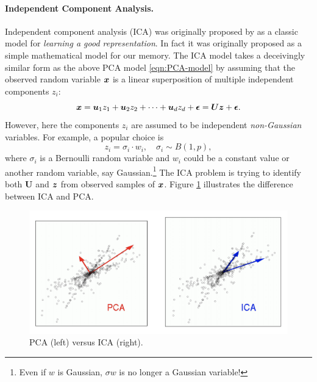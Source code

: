 \documentclass[../../book-main.tex]{subfiles}
\begin{document}
\paragraph{Independent Component Analysis.}
Independent component analysis (ICA) was originally proposed by \cite{Ans-1985} as a classic model for {\em learning a good representation}. In fact it was originally proposed as a simple mathematical model for our memory. The ICA model takes a deceivingly similar form as the above PCA model \eqref{eqn:PCA-model} by assuming that the observed random variable $\bm{x}$ is a linear superposition of multiple independent components $z_i$:
\begin{equation}
    \bm{x} = \boldsymbol{u}_1 z_1 + \boldsymbol{u}_2 z_2 + \cdots + \boldsymbol{u}_d z_d  + \boldsymbol{\epsilon} =  \boldsymbol{U} \bm{z} + \boldsymbol{\epsilon}.
    \label{eqn:ICA-model}
\end{equation}
However, here the components $z_i$ are assumed to be independent {\em non-Gaussian} variables. For example, a popular choice is
\begin{equation}
    z_i = \sigma_i \cdot w_i, \quad \sigma_i \sim B(1,p),
    \label{eqn:ICA-modes}
\end{equation}
where $\sigma_i$ is a Bernoulli random variable and $w_i$ could be a constant value or another random variable, say Gaussian.\footnote{Even if $w$ is Gaussian, $\sigma w$ is no longer a Gaussian variable!}  The ICA problem is trying to identify both $\boldsymbol{U}$ and $\bm{z}$ from observed samples of $\bm{x}$. Figure \ref{fig:ICA-PCA} illustrates the difference between ICA and PCA.

\begin{figure}
    \centering
    \includegraphics[width=0.7\linewidth]{figures/PCA_ICA.png}
    \caption{PCA (left) versus ICA (right).}
    \label{fig:ICA-PCA}
\end{figure}
\end{document}

